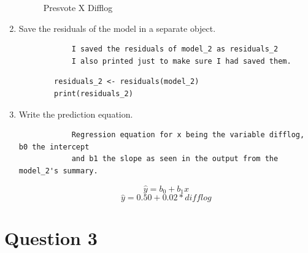 \documentclass[12pt,letterpaper]{article}
\begin{document}
\begin{enumerate}
\begin{figure}
			\caption{Presvote X Difflog}
		\end{figure}
		\item Save the residuals of the model in a separate object.
		\begin{verbatim}
			I saved the residuals of model_2 as residuals_2
			I also printed just to make sure I had saved them.
		\end{verbatim}
		\begin{lstlisting}
		residuals_2 <- residuals(model_2)
		print(residuals_2)
		\end{lstlisting}	
		\item Write the prediction equation.
		\begin{verbatim}
			Regression equation for x being the variable difflog, b0 the intercept 
			and b1 the slope as seen in the output from the model_2's summary.
		\end{verbatim}
		\begin{equation}
			\hat{y} = b_0 + b_1x
		\end{equation}
		\begin{equation}
			\hat{y} = 0.50 + 0.02*difflog
		\end{equation}
	\end{enumerate}
			
	\newpage	
\section*{Question 3}
\end{document}
